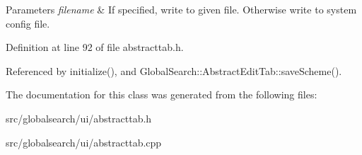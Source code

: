 \begin{DoxyParams}{Parameters}
{\em filename} & If specified, write to given file. Otherwise write to system config file. \\
\hline
\end{DoxyParams}


Definition at line 92 of file abstracttab.\+h.



Referenced by initialize(), and Global\+Search\+::\+Abstract\+Edit\+Tab\+::save\+Scheme().



The documentation for this class was generated from the following files\+:\begin{DoxyCompactItemize}
\item 
src/globalsearch/ui/abstracttab.\+h\item 
src/globalsearch/ui/abstracttab.\+cpp\end{DoxyCompactItemize}
